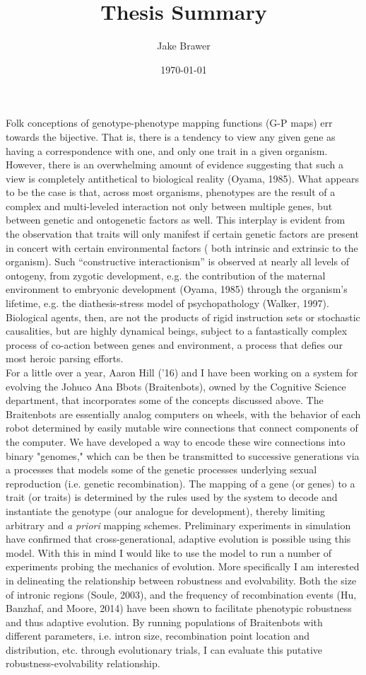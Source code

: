 \documentclass[11pt]{article}
\author{Jake Brawer}
\date{\today}
\title{Thesis Summary}
\begin{document}
\maketitle
Folk conceptions of genotype-phenotype mapping functions (G-P maps) err towards the bijective. 
That is, there is a tendency to view any given gene as having a correspondence with one, and only one 
trait in a given organism. However, there is an overwhelming amount of evidence suggesting that such a view is completely 
antithetical to biological reality (Oyama, 1985). What appears to be the case is that, across most organisms,
 phenotypes are the result of a complex and multi-leveled interaction not only between multiple genes, but between genetic and ontogenetic factors as well. 
This  interplay is evident from the observation that traits will only manifest if certain genetic factors are present in
 concert with certain environmental factors ( both intrinsic and extrinsic to the organism). Such “constructive interactionism” 
is observed at nearly all levels of ontogeny, from zygotic development, e.g. the contribution of the maternal environment to
 embryonic development (Oyama, 1985) through the organism’s lifetime, e.g. the diathesis-stress model of psychopathology (Walker, 1997).
 Biological agents, then, are not the products of rigid instruction sets or stochastic causalities, but are highly dynamical beings,
 subject to a fantastically complex process of co-action between genes and environment, a process that defies our 
 most heroic parsing efforts.\\
\indent For  a little over a year, Aaron Hill ('16) and I have been working on a system for evolving the Johuco Ana Bbots (Braitenbots), owned by the 
Cognitive Science department, that incorporates some of the concepts discussed above. The Braitenbots are essentially analog computers on wheels, with 
the behavior of each robot determined by easily mutable wire connections that connect components of the computer. We have developed a way to encode
these wire connections into binary "genomes," which can be then be transmitted to successive generations via a processes that models some of the genetic processes
underlying sexual reproduction (i.e. genetic recombination). The mapping of a gene (or genes) to a trait (or traits) is determined by the rules used by
the system to decode and instantiate the genotype (our analogue for development), thereby limiting arbitrary and \emph{a priori} mapping schemes. Preliminary experiments in simulation
have confirmed that cross-generational, adaptive evolution is possible using this model. With this in mind I would like to use the model to run a number of experiments
 probing the mechanics of evolution. More specifically I am interested in delineating the relationship between robustness and evolvability.
 Both the size of intronic regions (Soule, 2003), and the frequency of recombination events (Hu, Banzhaf, and Moore, 2014) have been shown to facilitate phenotypic robustness 
and thus adaptive evolution. By running populations of Braitenbots with different parameters, i.e. intron size, recombination point location and distribution, etc. through 
evolutionary trials, I can evaluate this putative robustness-evolvability relationship. 
\end{document}

